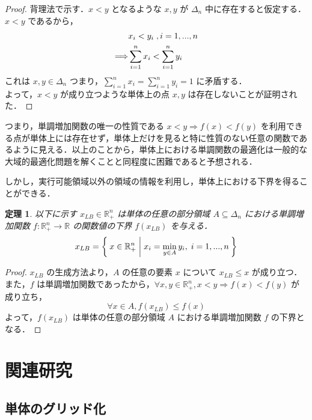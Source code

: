 \documentclass[a4paper,11pt]{jreport}
\newtheorem{theorem}{定理}
\begin{document}
\begin{proof}
背理法で示す．$ x < y $ となるような $ x, y $ が $ \Delta_n $ 中に存在すると仮定する．\\
$ x < y $ であるから，
\begin{align}
& x_i < y_i \;, i = 1, ..., n \notag \\
\Longrightarrow & \sum_{i=1}^n x_i < \sum_{i=1}^n y_i \notag
\end{align}
これは $ x, y \in \Delta_n $ つまり，$ \sum_{i=1}^n x_i = \sum_{i=1}^n y_i = 1 $ に矛盾する．\\
よって，$ x < y $ が成り立つような単体上の点 $ x, y $ は存在しないことが証明された．
\end{proof}

つまり，単調増加関数の唯一の性質である $ x < y \Rightarrow f(x) < f(y) $ を利用できる点が単体上には存在せず，単体上だけを見ると特に性質のない任意の関数であるように見える．以上のことから，単体上における単調関数の最適化は一般的な大域的最適化問題を解くことと同程度に困難であると予想される．\par
しかし，実行可能領域以外の領域の情報を利用し，単体上における下界を得ることができる．\\

\begin{theorem}
以下に示す $ x_{LB} \in \mathbb{R}^n_{+} $ は単体の任意の部分領域 $ A \subseteq \Delta_n $ における単調増加関数 $ f :  \mathbb{R}^n_{+} \to \mathbb{R} $ の関数値の下界 $ f(x_{LB}) $ を与える．
$$ x_{LB} = \Set{ x \in \mathbb{R}^n_{+} | x_i = \min_{y \in A } y_i, \; i = 1, ..., n } $$
\end{theorem}

\begin{proof}
$ x_{LB} $ の生成方法より，$ A $ の任意の要素 $ x $ について $ x_{LB} \leq x $ が成り立つ．\\
また，$ f $ は単調増加関数であったから，$ \forall x, y \in \mathbb{R}^n_{+}, x < y \Rightarrow f(x) < f(y) $ が成り立ち，
$$ \forall x \in A, f(x_{LB}) \leq f(x) $$
よって，$ f(x_{LB}) $ は単体の任意の部分領域 $ A $ における単調増加関数 $ f $ の下界となる．
\end{proof}

\chapter{関連研究}
\section{単体のグリッド化}
\end{document}
